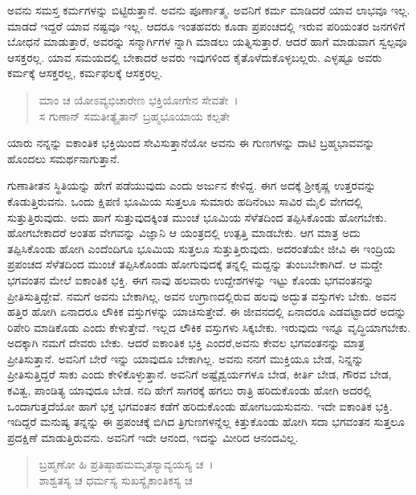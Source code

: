 ಅವನು ಸಮಸ್ತ ಕರ್ಮಗಳನ್ನು ಬಿಟ್ಟಿರುತ್ತಾನೆ. ಅವನು ಪೂರ್ಣಾತ್ಮ. ಅವನಿಗೆ ಕರ್ಮ ಮಾಡಿದರೆ ಯಾವ ಲಾಭವೂ ಇಲ್ಲ. ಮಾಡದೆ ಇದ್ದರೆ ಯಾವ ನಷ್ಟವೂ ಇಲ್ಲ. ಆದರೂ ಇಂತಹವರು ಕೂಡಾ ಪ್ರಪಂಚದಲ್ಲಿ ಇರುವ ಪರಿಯಂತರ ಜನಗಳಿಗೆ ಬೋಧನೆ ಮಾಡುತ್ತಾರೆ, ಅವರನ್ನು ಸನ್ಮಾರ್ಗಿಗಳ ನ್ನಾಗಿ ಮಾಡಲು ಯತ್ನಿಸುತ್ತಾರೆ. ಆದರೆ ಹಾಗೆ ಮಾಡುವಾಗ ಸ್ವಲ್ಪವೂ ಆಸಕ್ತರಲ್ಲ. ಯಾವ ಸಮಯದಲ್ಲಿ ಬೇಕಾದರೆ ಅವರು ಇವುಗಳಿಂದ ಕೈತೊಳೆದುಕೊಳ್ಳಬಲ್ಲರು. ಎಳ್ಳಷ್ಟೂ ಅವರು ಕರ್ಮಕ್ಕೆ ಆಸಕ್ತರಲ್ಲ, ಕರ್ಮಫಲಕ್ಕೆ ಆಸಕ್ತರಲ್ಲ.

\begin{verse}
ಮಾಂ ಚ ಯೋಽವ್ಯಭಿಚಾರೇಣ ಭಕ್ತಿಯೋಗೇನ ಸೇವತೇ~।\\ಸ ಗುಣಾನ್ ಸಮತೀತ್ಯೈತಾನ್ ಬ್ರಹ್ಮಭೂಯಾಯ ಕಲ್ಪತೇ 
\end{verse}

{\small ಯಾರು ನನ್ನನ್ನು ಐಕಾಂತಿಕ ಭಕ್ತಿಯಿಂದ ಸೇವಿಸುತ್ತಾನೆಯೋ ಅವನು ಈ ಗುಣಗಳನ್ನು ದಾಟಿ ಬ್ರಹ್ಮಭಾವವನ್ನು ಹೊಂದಲು ಸಮರ್ಥನಾಗುತ್ತಾನೆ.}

ಗುಣಾತೀತನ ಸ್ಥಿತಿಯನ್ನು ಹೇಗೆ ಪಡೆಯುವುದು ಎಂದು ಅರ್ಜುನ ಕೇಳಿದ್ದ. ಈಗ ಅದಕ್ಕೆ ಶ‍್ರೀಕೃಷ್ಣ ಉತ್ತರವನ್ನು ಕೊಡುತ್ತಿರುವನು. ಒಂದು ಕ್ಷಿಪಣಿ ಭೂಮಿಯ ಸುತ್ತಲೂ ಸುಮಾರು ಹದಿನೆಂಟು ಸಾವಿರ ಮೈಲಿ ವೇಗದಲ್ಲಿ ಸುತ್ತುತ್ತಿರುವುದು. ಅದು ಹಾಗೆ ಸುತ್ತುವುದಕ್ಕಿಂತ ಮುಂಚೆ ಭೂಮಿಯ ಸೆಳೆತದಿಂದ ತಪ್ಪಿಸಿಕೊಂಡು ಹೋಗಬೇಕು. ಹೋಗಬೇಕಾದರೆ ಅಂತಹ ವೇಗವನ್ನು ವಿಜ್ಞಾನಿ ಆ ಯಂತ್ರದಲ್ಲಿ ಉತ್ಪತ್ತಿ ಮಾಡಬೇಕು. ಆಗ ಮಾತ್ರ ಅದು ತಪ್ಪಿಸಿಕೊಂಡು ಹೋಗಿ ಎಂದೆಂದಿಗೂ ಭೂಮಿಯ ಸುತ್ತಲೂ ಸುತ್ತುತ್ತಿರುವುದು. ಅದರಂತೆಯೇ ಜೀವಿ ಈ ಇಂದ್ರಿಯ ಪ್ರಪಂಚದ ಸೆಳೆತದಿಂದ ಮುಂಚೆ ತಪ್ಪಿಸಿಕೊಂಡು ಹೋಗುವುದಕ್ಕೆ ತನ್ನಲ್ಲಿ ಮದ್ದನ್ನು ತುಂಬಬೇಕಾಗಿದೆ. ಆ ಮದ್ದೇ ಭಗವಂತನ ಮೇಲೆ ಐಕಾಂತಿಕ ಭಕ್ತಿ. ಈಗ ನಾವು ಹಲವಾರು ಉದ್ದೇಶಗಳನ್ನು ಇಟ್ಟು ಕೊಂಡು ಭಗವಂತನನ್ನು ಪ್ರೀತಿಸುತ್ತಿದ್ದೇವೆ. ನಮಗೆ ಅವನು ಬೇಕಾಗಿಲ್ಲ. ಅವನ ಉಗ್ರಾಣದಲ್ಲಿರುವ ಹಲವು ಅದ್ಭುತ ವಸ್ತುಗಳು ಬೇಕು. ಅವನ ಹತ್ತಿರ ಹೋಗಿ ಏನಾದರೂ ಲೌಕಿಕ ವಸ್ತುಗಳನ್ನು ಯಾಚಿಸುತ್ತೇವೆ. ಈ ಜೀವನದಲ್ಲಿ ಏನಾದರೂ ಎಡವಟ್ಟಾದರೆ ಅದನ್ನು ರಿಪೇರಿ ಮಾಡಿಕೊಡು ಎಂದು ಕೇಳುತ್ತೇವೆ. ಇಲ್ಲದ ಲೌಕಿಕ ವಸ್ತುಗಳು ಸಿಕ್ಕಬೇಕು. ಇರುವುದು ಇನ್ನೂ ವೃದ್ಧಿಯಾಗಬೇಕು. ಅದಕ್ಕಾಗಿ ನಮಗೆ ದೇವರು ಬೇಕು. ಆದರೆ ಐಕಾಂತಿಕ ಭಕ್ತಿ ಎಂದರೆ,ಅವನು ಕೇವಲ ಭಗವಂತನನ್ನು ಮಾತ್ರ ಪ್ರೀತಿಸುತ್ತಾನೆ. ಅವನಿಗೆ ಬೇರೆ ಇನ್ನು ಯಾವುದೂ ಬೇಕಾಗಿಲ್ಲ. ಅವನು ನನಗೆ ಮುಕ್ತಿಯೂ ಬೇಡ, ನಿನ್ನನ್ನು ಪ್ರೀತಿಸುತ್ತಿದ್ದರೆ ಸಾಕು ಎಂದು ಕೇಳಿಕೊಳ್ಳುತ್ತಾನೆ. ಅವನಿಗೆ ಅಷ್ಟೈಶ್ವರ್ಯಗಳೂ ಬೇಡ, ಕೀರ್ತಿ ಬೇಡ, ಗೌರವ ಬೇಡ, ಕವಿತ್ವ, ಪಾಂಡಿತ್ಯ ಯಾವುದೂ ಬೇಡ. ನದಿ ಹೇಗೆ ಸಾಗರಕ್ಕೆ ಹಗಲು ರಾತ್ರಿ ಹರಿದುಕೊಂಡು ಹೋಗಿ ಅದರಲ್ಲಿ ಒಂದಾಗುತ್ತದೆಯೋ ಹಾಗೆ ಭಕ್ತ ಭಗವಂತನ ಕಡೆಗೆ ಹರಿದುಕೊಂಡು ಹೋಗಬಯಸುವನು. ಇದೇ ಐಕಾಂತಿಕ ಭಕ್ತಿ. ಇದಿದ್ದರೆ ಮನುಷ್ಯ ತನ್ನನ್ನು ಈ ಪ್ರಪಂಚಕ್ಕೆ ಬಿಗಿದ ತ್ರಿಗುಣಗಳನ್ನೆಲ್ಲ ಕಿತ್ತುಕೊಂಡು ಹೋಗಿ ಸದಾ ಭಗವಂತನ ಸುತ್ತಲೂ ಪ್ರದಕ್ಷಿಣೆ ಮಾಡುತ್ತಿರುವನು. ಅವನಿಗೆ ಇದೇ ಆನಂದ, ಇದನ್ನು ಮೀರಿದ ಆನಂದವಿಲ್ಲ.

\begin{verse}
ಬ್ರಹ್ಮಣೋ ಹಿ ಪ್ರತಿಷ್ಠಾಹಮಮೃತಸ್ಯಾವ್ಯಯಸ್ಯ ಚ~।\\ಶಾಶ್ವತಸ್ಯ ಚ ಧರ್ಮಸ್ಯ ಸುಖಸ್ಯೈಕಾಂತಿಕಸ್ಯ ಚ 
\end{verse}

